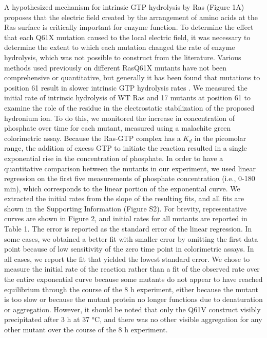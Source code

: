 A hypothesized mechanism for intrinsic GTP hydrolysis by Ras (Figure 1A) proposes that the electric field created by the arrangement of amino acids at the Ras surface is critically important for enzyme function. 
To determine the effect that each Q61X mutation caused to the local electric field, it was necessary to determine the extent to which each mutation changed the rate of enzyme hydrolysis, which was not possible to construct from the literature. 
Various methods used previously on different RasQ61X mutants have not been comprehensive or quantitative, but generally it has been found that mutations to position 61 result in slower intrinsic GTP hydrolysis rates \cite{Der1986, Krengel1990}. 
We measured the initial rate of intrinsic hydrolysis of WT Ras and 17 mutants at position 61 to examine the role of the residue in the electrostatic stabilization of the proposed hydronium ion. 
To do this, we monitored the increase in concentration of phosphate over time for each mutant, measured using a malachite green colorimetric assay. 
Because the Ras-GTP complex has a $K_d$ in the picomolar range, the addition of excess GTP to initiate the reaction resulted in a single exponential rise in the concentration of phosphate. 
In order to have a quantitative comparison between the mutants in our experiment, we used linear regression on the first five measurements of phosphate concentration (i.e., 0-180 min), which corresponds to the linear portion of the exponential curve. 
We extracted the initial rates from the slope of the resulting fits, and all fits are shown in the Supporting Information (Figure S2). 
For brevity, representative curves are shown in Figure 2, and initial rates for all mutants are reported in Table 1. 
The error is reported as the standard error of the linear regression. 
In some cases, we obtained a better fit with smaller error by omitting the first data point because of low sensitivity of the zero time point in colorimetric assays. 
In all cases, we report the fit that yielded the lowest standard error. 
We chose to measure the initial rate of the reaction rather than a fit of the observed rate over the entire exponential curve because some mutants do not appear to have reached equilibrium through the course of the 8 h experiment, either because the mutant is too slow or because the mutant protein no longer functions due to denaturation or aggregation. 
However, it should be noted that only the Q61V construct visibly precipitated after 3 h at 37 \si{\celsius}, and there was no other visible aggregation for any other mutant over the course of the 8 h experiment.

